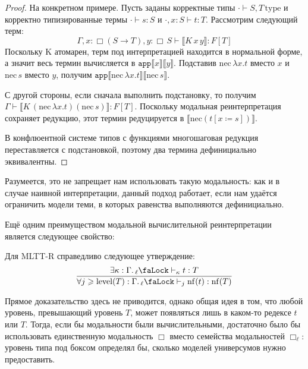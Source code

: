 \begin{proof}
    На конкретном примере. Пусть заданы корректные типы
    $\cdot\vdash S,T\,\mathrm{type}$ и корректно
    типизированные термы $\cdot\vdash s:S$ и
    $\cdot,x:S\vdash t:T$. Рассмотрим следующий терм:
    \[
    \Gamma,x:\Box(S\to T),y:\Box\,S\vdash
    \llbracket K\,x\,y\rrbracket:F[T]
    \]
    Поскольку $\mathrm{K}$ атомарен, терм под
    интерпретацией находится в нормальной форме, а
    значит весь термин вычисляется в
    $\mathtt{app}\llbracket x\rrbracket
    \llbracket y\rrbracket$. Подставив
    $\mathrm{nec}\,\lambda x.t$ вместо $x$ и
    $\mathrm{nec}\,s$ вместо $y$, получим
    $\mathtt{app}\llbracket\mathrm{nec}\,
    \lambda x.t\rrbracket\llbracket\mathrm{nec}\,
    s\rrbracket$.

    С другой стороны, если сначала выполнить
    подстановку, то получим $\Gamma\vdash\llbracket K\,
    (\mathrm{nec}\,\lambda x.t)(\mathrm{nec}\,s)
    \rrbracket:F[T]$. Поскольку модальная
    реинтерпретация сохраняет редукцию, этот термин
    редуцируется в
    $\llbracket\mathrm{nec}(t[x\coloneqq s])
    \rrbracket$.

    В конфлюентной системе типов с функциями
    многошаговая редукция переставляется с
    подстановкой, поэтому два термина дефинициально
    эквивалентны.
\end{proof}

Разумеется, это не запрещает нам использовать такую
модальность: как и в случае наивной интерпретации,
данный подход работает, если нам удаётся ограничить
модели теми, в которых равенства выполняются
дефинициально.

Ещё одним преимуществом модальной вычислительной
реинтерпретации является следующее свойство:

\begin{theorem}
    Для MLTT-R справедливо следующее утверждение:
    \[\dfrac{
        \exists\kappa:
        \Gamma.\,{}_\ell\text{\faLock}\vdash_\kappa
        t:T
    }{\forall j\geqslant\mathrm{level}(T):
        \Gamma.\,{}_\ell\text{\faLock}\vdash_j
        \mathrm{nf}(t):\mathrm{nf}(T)}\]
\end{theorem}

Прямое доказательство здесь не приводится, однако общая
идея в том, что любой уровень, превышающий уровень $T$,
может появляться лишь в каком-то редексе $t$ или $T$.
Тогда, если бы модальности были вычислительными,
достаточно было бы использовать единственную
модальность $\Box$ вместо семейства модальностей
$\Box_\ell$: уровень типа под боксом определял бы,
сколько моделей универсумов нужно предоставить.

